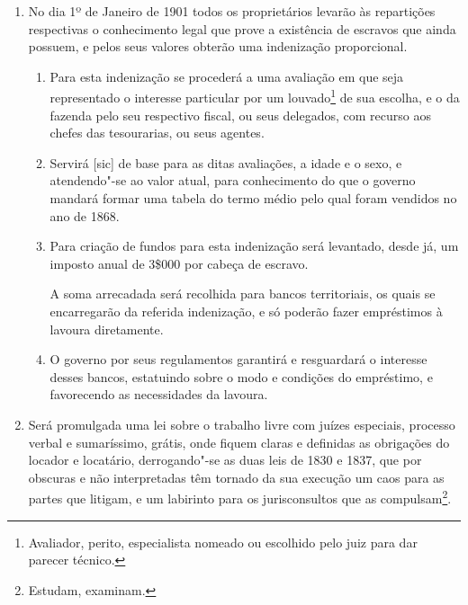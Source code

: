 \begin{enumerate}[label=Art. \arabic*º]
\begin{enumerate}[label=§ \arabic*º]
\item O proprietário que, dando parte do emancipamento\footnote{O
  mesmo que emancipação.} de um escravo, mostrar que o libertou na pia
batismal, poderá gozar de seus serviços até a idade de 15 anos, sendo,
porém, obrigado a mandar"-lhe ensinar, escrever e contar.
\end{enumerate}

\item No dia 1º de Janeiro de 1901 todos os proprietários levarão às
repartições respectivas o conhecimento legal que prove a existência de
escravos que ainda possuem, e pelos seus valores obterão uma indenização
proporcional.

\begin{enumerate}[label=§ \arabic*º]
\item Para esta indenização se procederá a uma avaliação em que seja
representado o interesse particular por um louvado\footnote{Avaliador,
  perito, especialista nomeado ou escolhido pelo juiz para dar parecer
  técnico.} de sua escolha, e o da fazenda pelo seu respectivo fiscal,
ou seus delegados, com recurso aos chefes das tesourarias, ou seus
agentes.

\item Servirá {[}sic{]} de base para as ditas avaliações, a idade e o
sexo, e atendendo"-se ao valor atual, para conhecimento do que o governo
mandará formar uma tabela do termo médio pelo qual foram vendidos no ano
de 1868.

\item Para criação de fundos para esta indenização será levantado, desde
já, um imposto anual de 3\$000 por cabeça de escravo.

A soma arrecadada será recolhida para bancos territoriais, os quais se
encarregarão da referida indenização, e só poderão fazer empréstimos à
lavoura diretamente.

\item O governo por seus regulamentos garantirá e resguardará o
interesse desses bancos, estatuindo sobre o modo e condições do
empréstimo, e favorecendo as necessidades da lavoura.
\end{enumerate}

\item Será promulgada uma lei sobre o trabalho livre com juízes
especiais, processo verbal e sumaríssimo, grátis, onde fiquem claras e
definidas as obrigações do locador e locatário, derrogando"-se as duas
leis de 1830 e 1837, que por obscuras e não interpretadas têm tornado da
sua execução um caos para as partes que litigam, e um labirinto para os
jurisconsultos que as compulsam\footnote{Estudam, examinam.}.


\end{enumerate}
